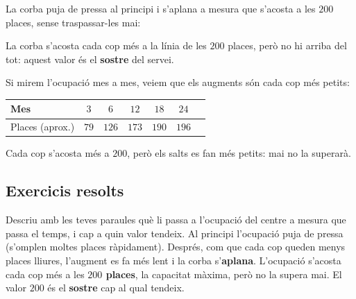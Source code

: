 \begin{exemple}
La corba puja de pressa al principi i s'aplana a mesura que s'acosta a les $200$
places, sense traspassar-les mai:

\begin{center}

\end{center}

\noindent La corba s'acosta cada cop més a la línia de les $200$ places, però no hi
arriba del tot: aquest valor és el \textbf{sostre} del servei.
\end{exemple}

\begin{exemple}
Si mirem l'ocupació mes a mes, veiem que els augments són cada cop més petits:
\begin{center}
\begin{tabular}{lcccccc}
\toprule
Mes & $3$ & $6$ & $12$ & $18$ & $24$ \\
\midrule
Places (aprox.) & $79$ & $126$ & $173$ & $190$ & $196$ \\
\bottomrule
\end{tabular}
\end{center}
Cada cop s'acosta més a $200$, però els salts es fan més petits: mai no la superarà.
\end{exemple}

\subsection{Exercicis resolts}

\begin{exresolt}
Descriu amb les teves paraules què li passa a l'ocupació del centre a mesura que
passa el temps, i cap a quin valor tendeix.
\solucio
Al principi l'ocupació puja de pressa (s'omplen moltes places ràpidament). Després,
com que cada cop queden menys places lliures, l'augment es fa més lent i la corba
s'\textbf{aplana}. L'ocupació s'acosta cada cop més a les \textbf{$200$ places}, la
capacitat màxima, però no la supera mai. El valor $200$ és el \textbf{sostre} cap al
qual tendeix.
\end{exresolt}

